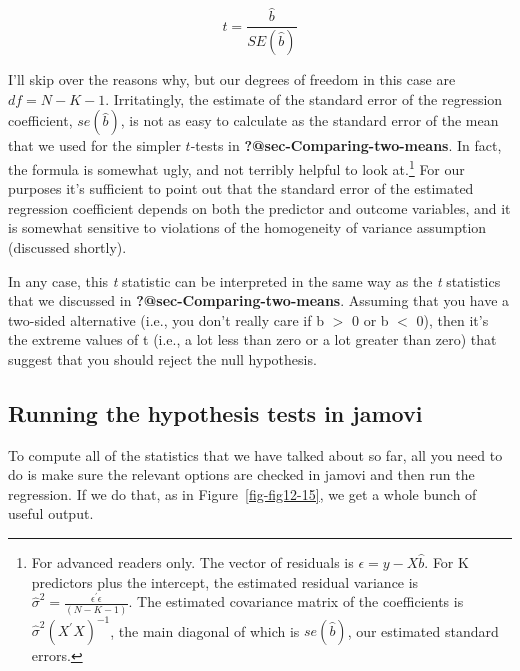 \documentclass[
  a4paper,
]{book}
\begin{document}
\[t=\frac{\hat{b}}{SE(\hat{b})}\]

I'll skip over the reasons why, but our degrees of freedom in this case
are \(df = N - K - 1\). Irritatingly, the estimate of the standard error
of the regression coefficient, \(se(\hat{b})\), is not as easy to
calculate as the standard error of the mean that we used for the simpler
\(t\)-tests in \textbf{?@sec-Comparing-two-means}. In fact, the formula
is somewhat ugly, and not terribly helpful to look at.\footnote{For
  advanced readers only. The vector of residuals is
  \(\epsilon=y - X\hat{b}\). For K predictors plus the intercept, the
  estimated residual variance is
  \(\hat{\sigma}^2 = \frac{\epsilon^{'}\epsilon}{(N - K - 1)}\). The
  estimated covariance matrix of the coefficients is
  \(\hat{\sigma}^{2}(X^{'}X)^{-1}\), the main diagonal of which is
  \(se(\hat{b})\), our estimated standard errors.} For our purposes it's
sufficient to point out that the standard error of the estimated
regression coefficient depends on both the predictor and outcome
variables, and it is somewhat sensitive to violations of the homogeneity
of variance assumption (discussed shortly).

In any case, this \emph{t} statistic can be interpreted in the same way
as the \emph{t} statistics that we discussed in
\textbf{?@sec-Comparing-two-means}. Assuming that you have a two-sided
alternative (i.e., you don't really care if b \(>\) 0 or b \(<\) 0),
then it's the extreme values of t (i.e., a lot less than zero or a lot
greater than zero) that suggest that you should reject the null
hypothesis.

\hypertarget{running-the-hypothesis-tests-in-jamovi}{%
\subsection{Running the hypothesis tests in
jamovi}\label{running-the-hypothesis-tests-in-jamovi}}

To compute all of the statistics that we have talked about so far, all
you need to do is make sure the relevant options are checked in jamovi
and then run the regression. If we do that, as in
Figure~\ref{fig-fig12-15}, we get a whole bunch of useful output.
\end{document}
